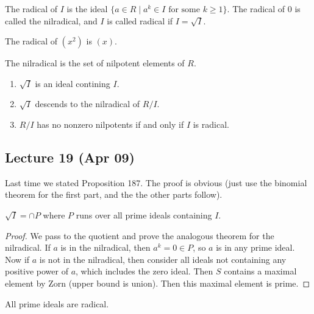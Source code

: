 \message{ !name(notes.tex)}\documentclass[10pt, twoside]{article}
\begin{document}
        \begin{defn}
            The radical of $I$ is the ideal $\{a \in R \mid a^k \in I \text{ for some }k\geq 1\}$. The radical of $0$ is called the nilradical, and $I$ is called radical if $I=\sqrt{I}$.
        \end{defn}

        \begin{exm}
            The radical of $(x^2)$ is $(x)$.
        \end{exm}

    \begin{exm}
        The nilradical is the set of nilpotent elements of $R$.
    \end{exm}

    \begin{prop}
        \begin{enumerate}
            \item $\sqrt{I}$ is an ideal contining $I$.
            \item $\sqrt{I}$ descends to the nilradical of $R/I$.
            \item $R/I$ has no nonzero nilpotents if and only if $I$ is radical.
        \end{enumerate}
    \end{prop}
        
    \subsection{Lecture 19 (Apr 09)}
        Last time we stated Proposition 187. The proof is obvious (just use the binomial theorem for the first part, and the the other parts follow).

    \begin{prop}
        $\sqrt{I} = \cap P$ where $P$ runs over all prime ideals containing $I$.
        \begin{proof}
                We pass to the quotient and prove the analogous theorem for the nilradical. If $a$ is in the nilradical, then $a^k = 0 \in P$, so $a$ is in any prime ideal. Now if $a$ is not in the nilradical, then consider all ideals not containing any positive power of $a$, which includes the zero ideal. Then $S$ contains a maximal element by Zorn (upper bound is union). Then this maximal element is prime.
        \end{proof}
    \end{prop}

    \begin{cor}
        All prime ideals are radical.
    \end{cor}
\end{document}
